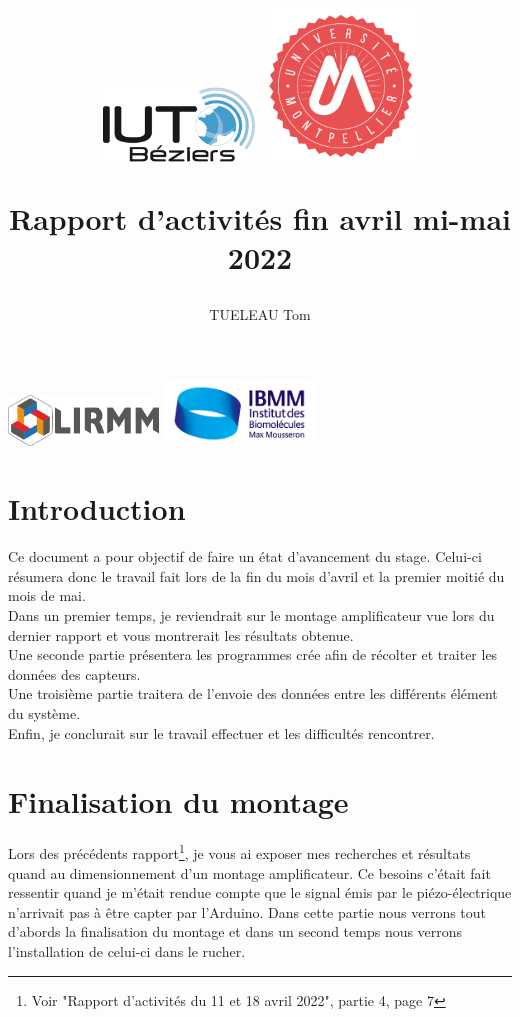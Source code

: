 \documentclass[11pt,french,a4paper]{article}
\title{
 \centering
         \includegraphics[width=4cm]{../../../logo/IUTlogo.png}  \hspace{7cm}
         \includegraphics[width=4cm]{../../../logo/UMlogo.png}  \hspace{7cm}
    
	\LARGE{Rapport d'activités fin avril mi-mai 2022 }
	\author{TUELEAU Tom}
}
\author{
	\date{}
}
\begin{document}
\maketitle
	 \includegraphics[width=4cm]{../../../logo/LIRMMlogo.png}  \hspace{7cm}
         \includegraphics[width=4cm]{../../../logo/IBMMlogo.jpg}  \hspace{7cm}
\newpage
\tableofcontents
\newpage
\section{Introduction}
Ce document a pour objectif de faire un état d'avancement du stage. Celui-ci résumera donc le travail fait lors de la fin du mois d'avril et la premier moitié du mois de mai.
\\Dans un premier temps, je reviendrait sur le montage amplificateur vue lors du dernier rapport et vous montrerait les résultats obtenue.
\\Une seconde partie présentera les programmes crée afin de récolter et traiter les données des capteurs. 
\\Une troisième partie traitera de l'envoie des données entre les différents élément du système.
\\Enfin, je conclurait sur le travail effectuer et les difficultés rencontrer. 

\section{Finalisation du montage}
Lors des précédents rapport\footnote{Voir "Rapport d’activités du 11 et 18 avril 2022", partie 4, page 7}, je vous ai exposer mes recherches et résultats quand au dimensionnement d'un montage amplificateur. Ce besoins c'était fait ressentir quand je m'était rendue compte que le signal émis par le piézo-électrique n'arrivait pas à être capter par l'Arduino.  Dans cette partie nous verrons tout d'abords la finalisation du montage et dans un second temps nous verrons l'installation de celui-ci dans le rucher.\\
\end{document}

